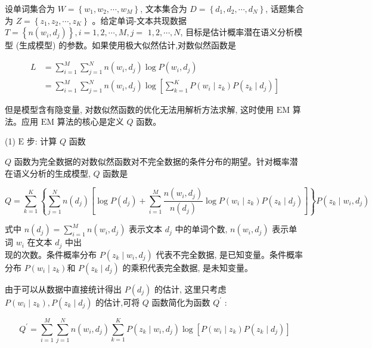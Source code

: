 \documentclass[10pt]{article}
\begin{document}
设单词集合为 $W=\left\{w_{1}, w_{2}, \cdots, w_{M}\right\}$, 文本集合为 $D=\left\{d_{1}, d_{2}, \cdots, d_{N}\right\}$, 话题集合为 $Z=\left\{z_{1}, z_{2}, \cdots, z_{K}\right\}$ 。给定单词-文本共现数据 $T=\left\{n\left(w_{i}, d_{j}\right)\right\}, i=1,2, \cdots, M, j=$ $1,2, \cdots, N$, 目标是估计概率潜在语义分析模型 (生成模型) 的参数。如果使用极大似然估计,对数似然函数是

$$
\begin{aligned}
L & =\sum_{i=1}^{M} \sum_{j=1}^{N} n\left(w_{i}, d_{j}\right) \log P\left(w_{i}, d_{j}\right) \\
& =\sum_{i=1}^{M} \sum_{j=1}^{N} n\left(w_{i}, d_{j}\right) \log \left[\sum_{k=1}^{K} P\left(w_{i} \mid z_{k}\right) P\left(z_{k} \mid d_{j}\right)\right]
\end{aligned}
$$

但是模型含有隐变量, 对数似然函数的优化无法用解析方法求解, 这时使用 $\mathrm{EM}$ 算法。应用 $\mathrm{EM}$ 算法的核心是定义 $Q$ 函数。

(1) $\mathrm{E}$ 步: 计算 $Q$ 函数

$Q$ 函数为完全数据的对数似然函数对不完全数据的条件分布的期望。针对概率潜在语义分析的生成模型, $Q$ 函数是


\begin{equation*}
Q=\sum_{k=1}^{K}\left\{\sum_{j=1}^{N} n\left(d_{j}\right)\left[\log P\left(d_{j}\right)+\sum_{i=1}^{M} \frac{n\left(w_{i}, d_{j}\right)}{n\left(d_{j}\right)} \log P\left(w_{i} \mid z_{k}\right) P\left(z_{k} \mid d_{j}\right)\right]\right\} P\left(z_{k} \mid w_{i}, d_{j}\right) \tag{18.9}
\end{equation*}


式中 $n\left(d_{j}\right)=\sum_{i=1}^{M} n\left(w_{i}, d_{j}\right)$ 表示文本 $d_{j}$ 中的单词个数, $n\left(w_{i}, d_{j}\right)$ 表示单词 $w_{i}$ 在文本 $d_{j}$ 中出\\
现的次数。条件概率分布 $P\left(z_{k} \mid w_{i}, d_{j}\right)$ 代表不完全数据, 是已知变量。条件概率分布 $P\left(w_{i} \mid z_{k}\right)$和 $P\left(z_{k} \mid d_{j}\right)$ 的乘积代表完全数据, 是未知变量。

由于可以从数据中直接统计得出 $P\left(d_{j}\right)$ 的估计, 这里只考虑 $P\left(w_{i} \mid z_{k}\right), P\left(z_{k} \mid d_{j}\right)$ 的估计,可将 $Q$ 函数简化为函数 $Q^{\prime}$ :


\begin{equation*}
Q^{\prime}=\sum_{i=1}^{M} \sum_{j=1}^{N} n\left(w_{i}, d_{j}\right) \sum_{k=1}^{K} P\left(z_{k} \mid w_{i}, d_{j}\right) \log \left[P\left(w_{i} \mid z_{k}\right) P\left(z_{k} \mid d_{j}\right)\right] \tag{18.10}
\end{equation*}
\end{document}
